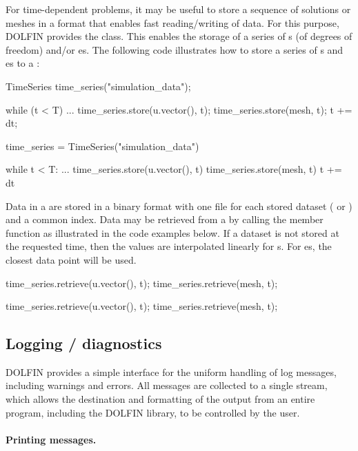 For time-dependent problems, it may be useful to store a
sequence of solutions or meshes in a format that enables fast
reading/writing of data. For this purpose, DOLFIN provides the
 class. This enables the storage of a series of
s (of degrees of freedom) and/or es. The
following code illustrates how to store a series of s and
es to a :
\begin{c++}
TimeSeries time_series("simulation_data");

while (t < T)
{
  ...
  time_series.store(u.vector(), t);
  time_series.store(mesh, t);
  t += dt;
}
\end{c++}
\begin{python}
time_series = TimeSeries("simulation_data")

while t < T:
    ...
    time_series.store(u.vector(), t)
    time_series.store(mesh, t)
    t += dt
\end{python}
Data in a  are stored in a binary format with one file
for each stored dataset ( or ) and a common
index. Data may be retrieved from a  by calling the
 member function as illustrated in the code examples
below. If a dataset is not stored at the requested time, then the
values are interpolated linearly for s. For es,
the closest data point will be used.
\begin{c++}
time_series.retrieve(u.vector(), t);
time_series.retrieve(mesh, t);
\end{c++}
\begin{python}
time_series.retrieve(u.vector(), t);
time_series.retrieve(mesh, t);
\end{python}

\subsection{Logging / diagnostics}

DOLFIN provides a simple interface for the uniform handling of log
messages, including warnings and errors. All messages are collected to a
single stream, which allows the destination and formatting of the output
from an entire program, including the DOLFIN library, to be controlled
by the user.

\paragraph{Printing messages.}

